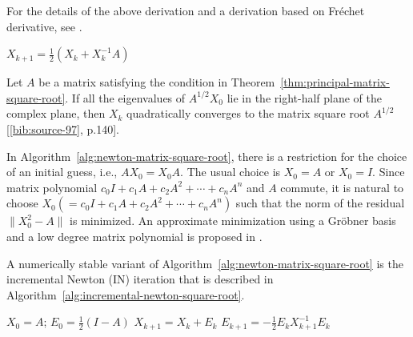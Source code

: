 {For the details of the above derivation and a derivation based on Fréchet derivative, see .}

\begin{algorithm}[H]\caption{{(Iterative method) Newton's method for $X=A^{1/2}$}}\label{alg:newton-matrix-square-root}\begin{algorithmic}[1]
\State $X_{k+1}=\frac{1}{2}(X_k+X_k^{-1}A)$
\EndFor
\end{algorithmic}\end{algorithm}

{Let $A$ be a matrix satisfying the condition in Theorem~\ref{thm:principal-matrix-square-root}. If all the eigenvalues of $A^{1/2}X_0$ lie in the right-half plane of the complex plane, then $X_k$ quadratically converges to the matrix square root $A^{1/2}$ [\hyperref[bib:source-97]{\ref*{bib:source-97}}, p.140].}

{In Algorithm~\ref{alg:newton-matrix-square-root}, there is a restriction for the choice of an initial guess, i.e., $AX_0=X_0A$. The usual choice is $X_0=A$ or $X_0=I$. Since matrix polynomial $c_0I+c_1A+c_2A^2+\cdots+c_nA^n$ and $A$ commute, it is natural to choose $X_0(=c_0I+c_1A+c_2A^2+\cdots+c_nA^n)$ such that the norm of the residual $\|X_0^2-A\|$ is minimized. An approximate minimization using a Gröbner basis and a low degree matrix polynomial is proposed in .}

{A numerically stable variant of Algorithm~\ref{alg:newton-matrix-square-root} is the incremental Newton (IN) iteration  that is described in Algorithm~\ref{alg:incremental-newton-square-root}.}

\begin{algorithm}[H]\caption{{(Iterative method) The IN method for $X=A^{1/2}$}}\label{alg:incremental-newton-square-root}\begin{algorithmic}[1]
\State $X_0=A$; $E_0=\frac{1}{2}(I-A)$
\State $X_{k+1}=X_k+E_k$
\State $E_{k+1}=-\frac{1}{2}E_kX_{k+1}^{-1}E_k$
\EndFor
\end{algorithmic}\end{algorithm}

